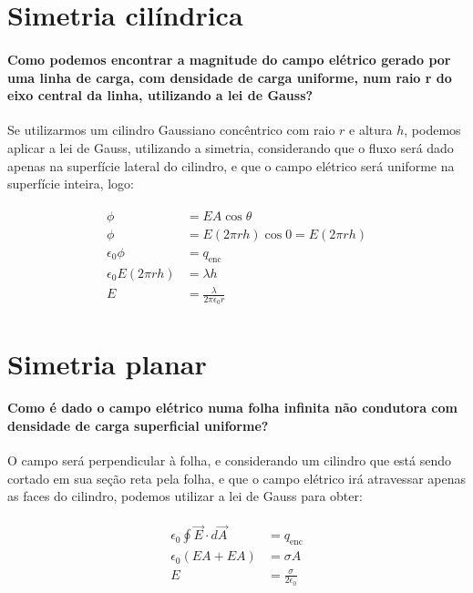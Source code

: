\begin{multicols*}{2}
\section*{Simetria cilíndrica}

  \paragraph{Como podemos encontrar a magnitude do campo elétrico gerado por uma linha de carga, com densidade de carga uniforme, num raio r do eixo central da linha, utilizando a lei de Gauss?} Se utilizarmos um cilindro Gaussiano concêntrico com raio $r$ e altura $h$, podemos aplicar a lei de Gauss, utilizando a simetria, considerando que o fluxo será dado apenas na superfície lateral do cilindro, e que o campo elétrico será uniforme na superfície inteira, logo:

  \begin{gather}
    \begin{align}
      \phi &= EA \cos{\theta} \\
      \phi &= E (2 \pi r h) \cos{0} = E (2 \pi r h) \\
      \epsilon_0 \phi &= q_{\text{enc}} \\
      \epsilon_0 E (2 \pi r h ) &= \lambda h \\
      E &= \frac{\lambda}{2 \pi \epsilon_0 r}
    \end{align}
  \end{gather}

\section*{Simetria planar}

  \paragraph{Como é dado o campo elétrico numa folha infinita não condutora com densidade de carga superficial uniforme?} O campo será perpendicular à folha, e considerando um cilindro que está sendo cortado em sua seção reta pela folha, e que o campo elétrico irá atravessar apenas as faces do cilindro, podemos utilizar a lei de Gauss para obter:

  \begin{gather}
    \begin{align}
      \epsilon_0 \oint \vec{E} \cdot d \vec{A} &= q_{\text{enc}} \\
      \epsilon_0 (EA + EA) &= \sigma A \\
      E &= \frac{\sigma}{2 \epsilon_0}
    \end{align}
  \end{gather}


\end{multicols*}
